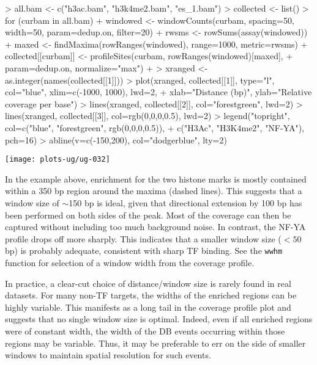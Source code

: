 \documentclass[12pt]{report}
\renewenvironment{Schunk}{\vspace{0pt}}{\vspace{0pt}}
\newcommand{\code}[1]{{\small\texttt{#1}}}
\begin{document}
\begin{Schunk}
\begin{Sinput}
> all.bam <- c("h3ac.bam", "h3k4me2.bam", "es_1.bam")
> collected <- list()
> for (curbam in all.bam) {
+     windowed <- windowCounts(curbam, spacing=50, width=50, param=dedup.on, filter=20)
+     rwsms <- rowSums(assay(windowed))
+     maxed <- findMaxima(rowRanges(windowed), range=1000, metric=rwsms)
+     collected[[curbam]] <- profileSites(curbam, rowRanges(windowed)[maxed], 
+         param=dedup.on, normalize="max")
+ }
> xranged <- as.integer(names(collected[[1]]))
> plot(xranged, collected[[1]], type="l", col="blue", xlim=c(-1000, 1000), lwd=2, 
+     xlab="Distance (bp)", ylab="Relative coverage per base")
> lines(xranged, collected[[2]], col="forestgreen", lwd=2)
> lines(xranged, collected[[3]], col=rgb(0,0,0,0.5), lwd=2)
> legend("topright", col=c("blue", "forestgreen", rgb(0,0,0,0.5)),
+     c("H3Ac", "H3K4me2", "NF-YA"), pch=16)
> abline(v=c(-150,200), col="dodgerblue", lty=2)
\end{Sinput}
\end{Schunk}

\begin{center}
\texttt{[image: plots-ug/ug-032]}
\end{center}

In the example above, enrichment for the two histone marks is mostly contained within a 350 bp region around the maxima (dashed lines).
This suggests that a window size of $\sim$150 bp is ideal, given that directional extension by 100 bp has been performed on both sides of the peak.
Most of the coverage can then be captured without including too much background noise.
In contrast, the NF-YA profile drops off more sharply.
This indicates that a smaller window size ($< 50$ bp) is probably adequate, consistent with sharp TF binding.
See the \code{wwhm} function for selection of a window width from the coverage profile.

In practice, a clear-cut choice of distance/window size is rarely found in real datasets.
For many non-TF targets, the widths of the enriched regions can be highly variable.
This manifests as a long tail in the coverage profile plot and suggests that no single window size is optimal.
Indeed, even if all enriched regions were of constant width, the width of the DB events occurring within those regions may be variable.
Thus, it may be preferable to err on the side of smaller windows to maintain spatial resolution for such events.
\end{document}
